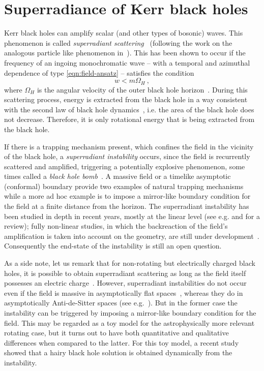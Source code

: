 \section{Superradiance of Kerr black holes}

Kerr black holes can amplify scalar (and other types of bosonic) waves.
This phenomenon is called \textit {superradiant scattering}~\cite{Misner:1972kx} (following the work on the analogous particle like phenomenon in~\cite{Penrose:1969pc,Christodoulou:1970wf}).
This has been shown to occur if the frequency of an ingoing monochromatic wave -- with a temporal and azimuthal dependence of type \eqref{eqn:field-ansatz} -- satisfies the condition 
\begin{equation}
w<m\Omega_H \ , 
\label{super_cond}
\end{equation}
where $\Omega_H$ is the angular velocity of the outer black hole horizon~\cite{Bardeen:1972fi,Starobinsky:1973a,Press:1972zz}.
During this scattering process, energy is extracted from the black hole in a way consistent with the second law of black hole dynamics~\cite{Bardeen:1973gs}, i.e. the area of the black hole does not decrease.
Therefore, it is only rotational energy that is being extracted from the black hole.

If there is a trapping mechanism present, which confines the field in the vicinity of the black hole, a \textit{superradiant instability} occurs, since the field is recurrently scattered and amplified, triggering a potentially explosive phenomenon, some times called a \textit{black hole bomb}~\cite{Press:1972zz}. 
A massive field or a timelike asymptotic (conformal) boundary provide two examples of natural trapping mechanisms while a more ad hoc example is to impose a mirror-like boundary condition for the field at a finite distance from the horizon.
The superradiant instability has been studied in depth in recent years, mostly at the linear level (see e.g. \cite{Dolan:2007mj,Dolan:2012yt} and \cite{Cardoso:2013krh} for a review); fully non-linear studies, in which the backreaction of the field's amplification is taken into account on the geometry, are still under development~\cite{Okawa:2014nda,East:2013mfa}.
Consequently the end-state of the instability is still an open question.

As a side note, let us remark that for non-rotating but electrically charged black holes, it is possible to obtain superradiant scattering as long as the field itself possesses an electric charge~\cite{Bekenstein:1973mi}.
However, superradiant instabilities do not occur even if the field is massive in asymptotically flat spaces~\cite{Hod:2013eea,Hod:2013nn}, whereas they do in asymptotically Anti-de-Sitter spaces (see e.g.~\cite{Wang:2014eha}).
But in the former case the instability can be triggered by imposing a mirror-like boundary condition for the field\cite{Herdeiro:2013pia,Hod:2013fvl,Degollado:2013bha}.
This may be regarded as a toy model for the astrophysically more relevant rotating case, but it turns out to have both quantitative and qualitative differences when compared to the latter.  
For this toy model, a recent study showed that a hairy black hole solution is obtained dynamically from the instability\cite{Sanchis-Gual:2015lje}.

